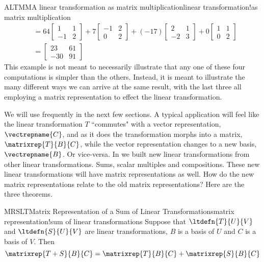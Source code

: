 \begin{example}{ALTMM}{A linear transformation as matrix multiplication}{linear transformation!as matrix multiplication}
\begin{align*}
%
&=
64\begin{bmatrix}1&1\\-1&2\end{bmatrix}+
7\begin{bmatrix}-1&2\\0&2\end{bmatrix}+
(-17)\begin{bmatrix}2&1\\-2&3\end{bmatrix}+
0\begin{bmatrix}1&1\\0&2\end{bmatrix}\\
%
&=
\begin{bmatrix}
23 & 61 \\ -30 & 91
\end{bmatrix}
\end{align*}
%
This example is not meant to necessarily illustrate that any one of these four computations is simpler than the others.  Instead, it is meant to illustrate the many different ways we can arrive at the same result, with the last three all employing a matrix representation to effect the linear transformation.
%
\end{example}
%
We will use  frequently in the next few sections.  A typical application will feel like the linear transformation $T$ ``commutes" with a vector representation, $\vectrepname{C}$, and as it does the transformation morphs into a matrix, $\matrixrep{T}{B}{C}$, while the vector representation changes to a new basis, $\vectrepname{B}$.  Or vice-versa.
%
%
%
In  we built new linear transformations from other linear transformations.  Sums, scalar multiples and compositions.  These new linear transformations will have matrix representations as well.  How do the new matrix representations relate to the old matrix representations?  Here are the three theorems.
%
\begin{theorem}{MRSLT}{Matrix Representation of a Sum of Linear Transformations}{matrix representation!sum of linear transformations}
Suppose that $\ltdefn{T}{U}{V}$ and $\ltdefn{S}{U}{V}$ are linear transformations, $B$ is a basis of $U$ and $C$ is a basis of $V$.  Then
%
\begin{equation*}
\matrixrep{T+S}{B}{C}=\matrixrep{T}{B}{C}+\matrixrep{S}{B}{C}
\end{equation*}
%
\end{theorem}
